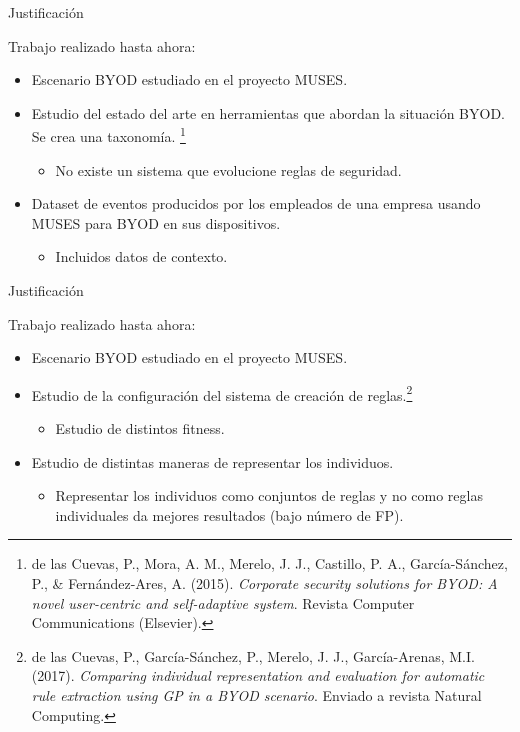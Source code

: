 \documentclass{beamer}
\begin{document}
\begin{frame}{Justificación}

Trabajo realizado hasta ahora:

\begin{itemize}
  \item Escenario BYOD estudiado en el proyecto MUSES.
  \item Estudio del estado del arte en herramientas que abordan la situación BYOD. Se crea una taxonomía. \footnote{{\scriptsize de las Cuevas, P., Mora, A. M., Merelo, J. J., Castillo, P. A., García-Sánchez, P., \& Fernández-Ares, A. (2015). \textit{Corporate security solutions for BYOD: A novel user-centric and self-adaptive system}. Revista Computer Communications (Elsevier).}}
  \begin{itemize}
  	\item No existe un sistema que evolucione reglas de seguridad.
  \end{itemize}
  \item Dataset de eventos producidos por los empleados de una empresa usando MUSES para BYOD en sus dispositivos.
  \begin{itemize}
  	    \item Incluidos datos de contexto.
  \end{itemize}
\end{itemize}

\end{frame}

\begin{frame}{Justificación}

Trabajo realizado hasta ahora:

\begin{itemize}
  \item Escenario BYOD estudiado en el proyecto MUSES.
  \item Estudio de la configuración del sistema de creación de reglas.\footnote{{\scriptsize de las Cuevas, P., García-Sánchez, P., Merelo, J. J., García-Arenas, M.I.(2017). \textit{Comparing individual representation and evaluation for automatic rule extraction using GP in a BYOD scenario}. Enviado a revista Natural Computing.}}
  \begin{itemize}
    \item Estudio de distintos fitness.
  \end{itemize}
  \item Estudio de distintas maneras de representar los individuos.
  \begin{itemize}
    \item Representar los individuos como conjuntos de reglas y no como reglas individuales da mejores resultados (bajo número de FP).
  \end{itemize}
\end{itemize}

\end{frame}
\end{document}
